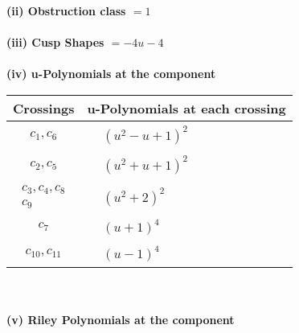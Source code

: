 \documentclass[1p]{elsarticle_modified}
\theoremstyle{definition}
\begin{document}
\flushleft \textbf{(ii) Obstruction class $= 1$}\\~\\
\flushleft \textbf{(iii) Cusp Shapes $= -4 u-4$}\\~\\
\newpage\renewcommand{\arraystretch}{1}
\flushleft \textbf{(iv) u-Polynomials at the component}\newline \\
\begin{tabular}{m{50pt}|m{274pt}}
Crossings & \hspace{64pt}u-Polynomials at each crossing \\
\hline $$\begin{aligned}c_{1},c_{6}\end{aligned}$$&$\begin{aligned}
&(u^2- u+1)^2
\end{aligned}$\\
\hline $$\begin{aligned}c_{2},c_{5}\end{aligned}$$&$\begin{aligned}
&(u^2+u+1)^2
\end{aligned}$\\
\hline $$\begin{aligned}c_{3},c_{4},c_{8}\\c_{9}\end{aligned}$$&$\begin{aligned}
&(u^2+2)^2
\end{aligned}$\\
\hline $$\begin{aligned}c_{7}\end{aligned}$$&$\begin{aligned}
&(u+1)^4
\end{aligned}$\\
\hline $$\begin{aligned}c_{10},c_{11}\end{aligned}$$&$\begin{aligned}
&(u-1)^4
\end{aligned}$\\
\hline
\end{tabular}\\~\\
\newpage\renewcommand{\arraystretch}{1}
\flushleft \textbf{(v) Riley Polynomials at the component}\newline \\
\end{document}
